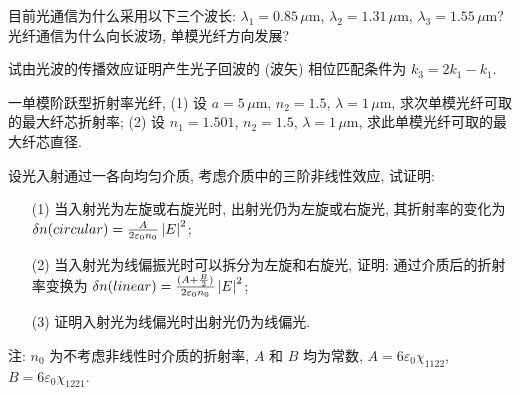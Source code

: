 \documentclass{assignment}
\begin{document}
\begin{prob}
    目前光通信为什么采用以下三个波长: $\lambda_1=0.85\,\mu$m, $\lambda_2=1.31\,\mu$m, $\lambda_3=1.55\,\mu$m? 光纤通信为什么向长波场, 单模光纤方向发展?
\end{prob}
\begin{sol}
    
\end{sol}

\begin{prob}
    试由光波的传播效应证明产生光子回波的 (波矢) 相位匹配条件为 $k_3=2k_1-k_1$.
\end{prob}
\begin{pf}

\end{pf}

\begin{prob}
    一单模阶跃型折射率光纤, (1) 设 $a=5\,\mu$m, $n_2=1.5$, $\lambda=1\,\mu$m, 求次单模光纤可取的最大纤芯折射率; (2) 设 $n_1=1.501$, $n_2=1.5$, $\lambda=1\,\mu$m, 求此单模光纤可取的最大纤芯直径.
\end{prob}
\begin{sol}
    
\end{sol}

\begin{prob}
    设光入射通过一各向均匀介质, 考虑介质中的三阶非线性效应, 试证明:
    \begin{itemize}
        \item[(1)] 当入射光为左旋或右旋光时, 出射光仍为左旋或右旋光, 其折射率的变化为 $\delta n(circular)=\frac{A}{2\varepsilon_0n_0}\left\lvert E\right\rvert^2$;
        \item[(2)] 当入射光为线偏振光时可以拆分为左旋和右旋光, 证明: 通过介质后的折射率变换为 $\delta n(linear)=\frac{(A+\frac{B}{2})}{2\varepsilon_0n_0}\left\lvert E\right\rvert^2$;
        \item[(3)] 证明入射光为线偏光时出射光仍为线偏光.
    \end{itemize}
    注: $n_0$ 为不考虑非线性时介质的折射率, $A$ 和 $B$ 均为常数, $A=6\varepsilon_0\chi_{1122}$, $B=6\varepsilon_0\chi_{1221}$.
\end{prob}
\begin{pf}

\end{pf}
\end{document}
